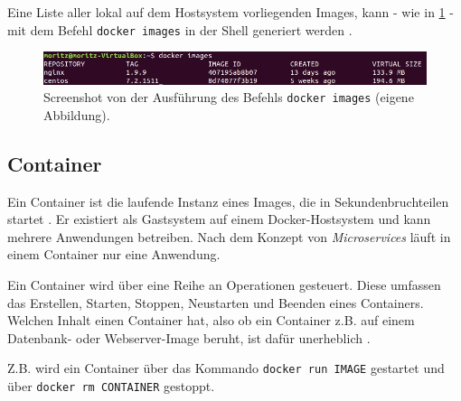 \documentclass[../main.tex]{subfiles}
\begin{document}
			Eine Liste aller lokal auf dem Hostsystem vorliegenden Images, kann - wie in \fig \ref{fig:intro_dockerImages} - mit dem Befehl \texttt{docker images} in der Shell generiert werden \cite{dockerImages}.

			\begin{figure}[!htbp]
          \centering
          \includegraphics[width=1.0\textwidth]{./images/intro_dockerImages.jpg}
          \caption{Screenshot von der Ausführung des Befehls \texttt{docker images} (eigene Abbildung).}
          \label{fig:intro_dockerImages}
      \end{figure}



    \subsection{Container}
		\label{dockerContainer}
			Ein Container ist die laufende Instanz eines Images, die in Sekundenbruchteilen startet \cite[S.1]{dockerIntroIEEE}. Er existiert als Gastsystem auf einem Docker-Hostsystem und kann mehrere Anwendungen betreiben. Nach dem Konzept von \emph{Microservices} läuft in einem Container nur eine Anwendung.

      Ein Container wird über eine Reihe an Operationen gesteuert. Diese umfassen das Erstellen, Starten, Stoppen, Neustarten und Beenden eines Containers. Welchen Inhalt einen Container hat, also ob ein Container z.B. auf einem Datenbank- oder Webserver-Image beruht, ist dafür unerheblich \cite[S.12]{dockerBook}\cite[S.2]{dockerLXCKub}.

			Z.B. wird ein Container über das Kommando \texttt{docker run IMAGE} gestartet und über \texttt{docker rm CONTAINER} gestoppt.
\end{document}
